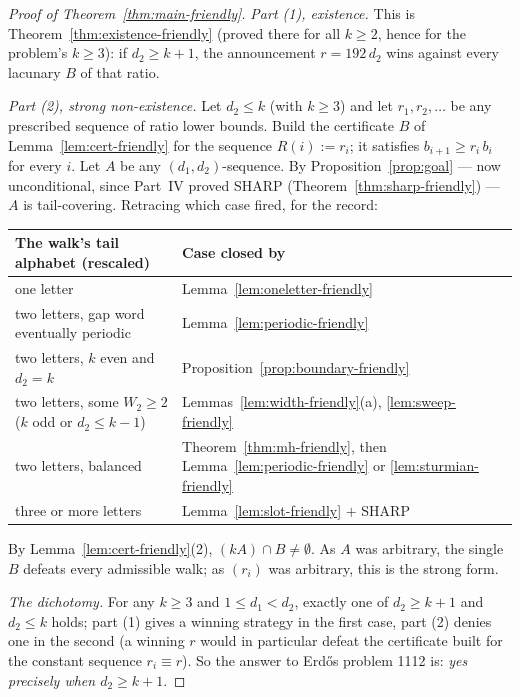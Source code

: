 \documentclass[11pt,reqno]{amsart}
\theoremstyle{plain}
\theoremstyle{definition}
\theoremstyle{remark}
\begin{document}
\begin{proof}[Proof of Theorem~\ref{thm:main-friendly}]
\emph{Part (1), existence.} This is Theorem~\ref{thm:existence-friendly} (proved
there for all $k \ge 2$, hence for the problem's $k \ge 3$): if $d_2 \ge k+1$,
the announcement $r = 192\,d_2$ wins against every lacunary $B$ of that ratio.

\emph{Part (2), strong non-existence.} Let $d_2 \le k$ (with $k \ge 3$) and let
$r_1, r_2, \dots$ be any prescribed sequence of ratio lower bounds. Build the
certificate $B$ of Lemma~\ref{lem:cert-friendly} for the sequence $R(i) := r_i$;
it satisfies $b_{i+1} \ge r_i\,b_i$ for every $i$. Let $A$ be any
$(d_1,d_2)$-sequence. By Proposition~\ref{prop:goal} --- now unconditional, since
Part~IV proved SHARP (Theorem~\ref{thm:sharp-friendly}) --- $A$ is
tail-covering. Retracing which case fired, for the record:

\begin{center}\small
\begin{tabular}{@{}ll@{}}
\toprule
The walk's tail alphabet (rescaled) & Case closed by \\
\midrule
one letter & Lemma~\ref{lem:oneletter-friendly} \\
two letters, gap word eventually periodic & Lemma~\ref{lem:periodic-friendly} \\
two letters, $k$ even and $d_2 = k$ & Proposition~\ref{prop:boundary-friendly} \\
two letters, some $W_2 \ge 2$ ($k$ odd or $d_2 \le k{-}1$) &
  Lemmas~\ref{lem:width-friendly}(a), \ref{lem:sweep-friendly} \\
two letters, balanced & Theorem~\ref{thm:mh-friendly}, then
  Lemma~\ref{lem:periodic-friendly} or \ref{lem:sturmian-friendly} \\
three or more letters & Lemma~\ref{lem:slot-friendly} $+$ SHARP \\
\bottomrule
\end{tabular}
\end{center}

By Lemma~\ref{lem:cert-friendly}(2), $(kA) \cap B \ne \emptyset$. As $A$ was
arbitrary, the single $B$ defeats every admissible walk; as $(r_i)$ was
arbitrary, this is the strong form.

\emph{The dichotomy.} For any $k \ge 3$ and $1 \le d_1 < d_2$, exactly one of
$d_2 \ge k + 1$ and $d_2 \le k$ holds; part (1) gives a winning strategy in the
first case, part (2) denies one in the second (a winning $r$ would in particular
defeat the certificate built for the constant sequence $r_i \equiv r$). So the
answer to Erd\H{o}s problem 1112 is: \emph{yes precisely when $d_2 \ge k+1$}.
\end{proof}
\end{document}
